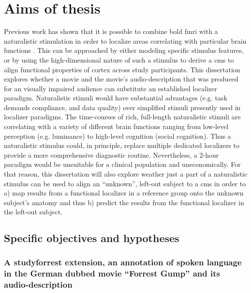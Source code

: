 \section{Aims of thesis}


%
Previous work has shown that it is possible to combine \ac{bold} \ac{fmri} with
a naturalistic stimulation in order to localize areas correlating with
particular brain functions \citep{bartels2004mapping}.
%
This can be approached by either modeling specific stimulus features, or by
using the high-dimensional nature of such a stimulus to derive a \ac{cms} to
align functional properties of cortex across study participants.
%
This dissertation explores whether a movie and the movie's audio-description
that was produced for an visually impaired audience can substitute an
established localizer paradigm.
%
Naturalistic stimuli would have substantial advantages (e.g. task demands
compliance, and data quality) over simplified stimuli presently used in
localizer paradigms.
%
The time-courses of rich, full-length naturalistic stimuli are correlating with a
variety of different brain functions ranging from low-level perception (e.g.
luminance) to high-level cognition (social cognition).
%
Thus a naturalistic stimulus could, in principle, replace multiple dedicated
localizers to provide a more comprehensive diagnostic routine.
%
Nevertheless, a 2-hour paradigm would be unsuitable for a clinical population
and uneconomically.
%
For that reason, this dissertation will also explore weather just a part of a
naturalistic stimulus can be used to align an ``unknown'', left-out subject to a
\ac{cms} in order to a) map results from a functional localizer in a reference
group onto the unknown subject's anatomy and thus b) predict the results from
the functional localizer in the left-out subject.
%


\subsection{Specific objectives and hypotheses}

\subsubsection{A studyforrest extension, an annotation of spoken language in the
German dubbed movie ``Forrest Gump'' and its audio-description}

